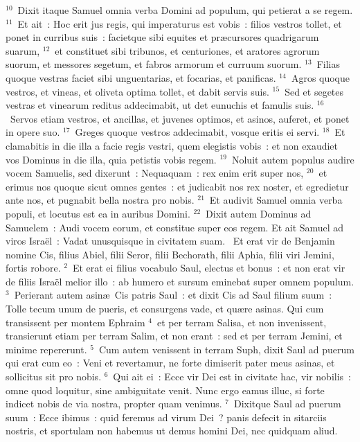 ${}^{10}$~Dixit itaque Samuel omnia verba Domini ad populum, qui petierat a se regem.
${}^{11}$~Et ait~: Hoc erit jus regis, qui imperaturus est vobis~: filios vestros tollet, et ponet in curribus suis~: facietque sibi equites et pr\ae cursores quadrigarum suarum,
${}^{12}$~et constituet sibi tribunos, et centuriones, et aratores agrorum suorum, et messores segetum, et fabros armorum et curruum suorum.
${}^{13}$~Filias quoque vestras faciet sibi unguentarias, et focarias, et panificas.
${}^{14}$~Agros quoque vestros, et vineas, et oliveta optima tollet, et dabit servis suis.
${}^{15}$~Sed et segetes vestras et vinearum reditus addecimabit, ut det eunuchis et famulis suis.
${}^{16}$~Servos etiam vestros, et ancillas, et juvenes optimos, et asinos, auferet, et ponet in opere suo.
${}^{17}$~Greges quoque vestros addecimabit, vosque eritis ei servi.
${}^{18}$~Et clamabitis in die illa a facie regis vestri, quem elegistis vobis~: et non exaudiet vos Dominus in die illa, quia petistis vobis regem.
${}^{19}$~Noluit autem populus audire vocem Samuelis, sed dixerunt~: Nequaquam~: rex enim erit super nos,
${}^{20}$~et erimus nos quoque sicut omnes gentes~: et judicabit nos rex noster, et egredietur ante nos, et pugnabit bella nostra pro nobis.
${}^{21}$~Et audivit Samuel omnia verba populi, et locutus est ea in auribus Domini.
${}^{22}$~Dixit autem Dominus ad Samuelem~: Audi vocem eorum, et constitue super eos regem. Et ait Samuel ad viros Isra\"el~: Vadat unusquisque in civitatem suam.
~Et erat vir de Benjamin nomine Cis, filius Abiel, filii Seror, filii Bechorath, filii Aphia, filii viri Jemini, fortis robore.
${}^{2}$~Et erat ei filius vocabulo Saul, electus et bonus~: et non erat vir de filiis Isra\"el melior illo~: ab humero et sursum eminebat super omnem populum.
${}^{3}$~Perierant autem asin\ae\ Cis patris Saul~: et dixit Cis ad Saul filium suum~: Tolle tecum unum de pueris, et consurgens vade, et qu\ae re asinas. Qui cum transissent per montem Ephraim
${}^{4}$~et per terram Salisa, et non invenissent, transierunt etiam per terram Salim, et non erant~: sed et per terram Jemini, et minime repererunt.
${}^{5}$~Cum autem venissent in terram Suph, dixit Saul ad puerum qui erat cum eo~: Veni et revertamur, ne forte dimiserit pater meus asinas, et sollicitus sit pro nobis.
${}^{6}$~Qui ait ei~: Ecce vir Dei est in civitate hac, vir nobilis~: omne quod loquitur, sine ambiguitate venit. Nunc ergo eamus illuc, si forte indicet nobis de via nostra, propter quam venimus.
${}^{7}$~Dixitque Saul ad puerum suum~: Ecce ibimus~: quid feremus ad virum Dei~? panis defecit in sitarciis nostris, et sportulam non habemus ut demus homini Dei, nec quidquam aliud.
